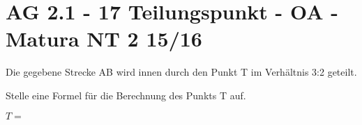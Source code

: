 \section{AG 2.1 - 17 Teilungspunkt - OA - Matura NT 2 15/16}

\begin{beispiel}[AG 2.1]{1} %
Die gegebene Strecke AB wird innen durch den Punkt T im Verhältnis 3:2 geteilt.

Stelle eine Formel für die Berechnung des Punkts T auf.

$T=$ 
\end{beispiel}